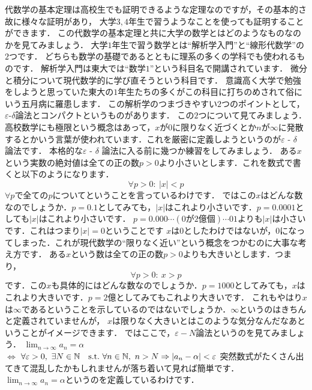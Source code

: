 代数学の基本定理は高校生でも証明できるような定理なのですが，その基本的さ故に様々な証明があり，
大学$3,4$年生で習うようなことを使っても証明することができます．
この代数学の基本定理と共に大学の数学とはどのようなものなのかを見てみましょう．
大学$1$年生で習う数学とは``解析学入門''と``線形代数学''の$2$つです．
どちらも数学の基礎であるとともに理系の多くの学科でも使われるものです．
解析学入門は東大では``数学$1$''という科目名で開講されています．
微分と積分について現代数学的に学び直そうという科目です．
意識高く大学で勉強をしようと思っていた東大の$1$年生たちの多くがこの科目に打ちのめされて俗にいう五月病に羅患します．
この解析学のつまづきやすい$2$つのポイントとして，\large{$\varepsilon$-$\delta$論法}と\large{コンパクト}というものがあります．
この$2$つについて見てみましょう．
高校数学にも極限という概念はあって，$x$が$0$に限りなく近づくとか$n$が$\infty$に発散するとかいう言葉が使われています．これを厳密に定義しようというのが$\varepsilon$ - $\delta$ 論法です．
本格的な$\varepsilon$ - $\delta$ 論法に入る前に幾つか練習をしてみましょう．
\ex
ある$x$という実数の絶対値は全ての正の数$p>0$より小さいとします．これを数式で書くと以下のようになります．
\[
\forall p > 0 : \ |x| < p
\]
$\forall p$で全ての$p$についてということを言っているわけです．
ではこの$x$はどんな数なのでしょうか．$p=0.1$としてみても，$|x|$はこれより小さいです．$p=0.0001$としても$|x|$はこれより小さいです．
$p=0.000\cdots (0が2億個) \cdots 01$よりも$|x|$は小さいです．これはつまり$|x| = 0$ということです
$x$は$0$としたわけではないが，$0$になってしまった．これが現代数学の``限りなく近い''という概念をつかむのに大事な考え方です．
\exx
\ex
ある$x$という数は全ての正の数$p>0$よりも大きいとします．つまり，
\[
\forall p > 0 : \ x > p
\]
です．この$x$も具体的にはどんな数なのでしょうか．$p=1000$としてみても，$x$はこれより大きいです．$p=2億$としてみてもこれより大きいです．
これもやはり$x$は$\infty$であるということを示しているのではないでしょうか．$\infty$というのはきちんと定義されていませんが，
$x$は限りなく大きいとはこのような気分なんだなあということがイメージできます．
\exx
ではここで，$\varepsilon-N$論法というのを見てみましょう．
$\lim_{n\to\infty} a_n = \alpha $\\
$\iff$
$\forall \varepsilon > 0,\  \exists N \in \mathbb N \quad \textrm{s.t.}\  \forall n \in \mathbb N,\  n > N \Rightarrow |a_n - \alpha | < \varepsilon $
突然数式がたくさん出てきて混乱したかもしれませんが落ち着いて見れば簡単です．\\
$\lim_{n\to\infty} a_n = \alpha $というのを定義しているわけです．\\
